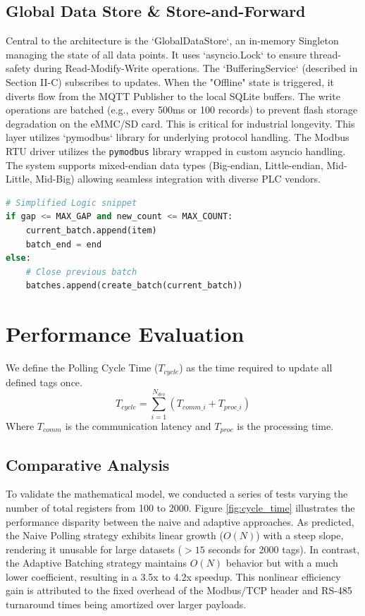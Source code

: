 \documentclass[journal]{IEEEtran}
\begin{document}
\subsection{Global Data Store \& Store-and-Forward}
Central to the architecture is the `GlobalDataStore`, an in-memory Singleton managing the state of all data points. It uses `asyncio.Lock` to ensure thread-safety during Read-Modify-Write operations.
The `BufferingService` (described in Section II-C) subscribes to updates. When the "Offline" state is triggered, it diverts flow from the MQTT Publisher to the local SQLite buffers. The write operations are batched (e.g., every 500ms or 100 records) to prevent flash storage degradation on the eMMC/SD card. This is critical for industrial longevity. This layer utilizes `pymodbus` library for underlying protocol handling.
The Modbus RTU driver utilizes the \texttt{pymodbus} library wrapped in custom asyncio handling. The system supports mixed-endian data types (Big-endian, Little-endian, Mid-Little, Mid-Big) allowing seamless integration with diverse PLC vendors.

\begin{footnotesize}
\begin{lstlisting}[language=Python, caption=Detailed Batching Logic]
# Simplified Logic snippet
if gap <= MAX_GAP and new_count <= MAX_COUNT:
    current_batch.append(item)
    batch_end = end
else:
    # Close previous batch
    batches.append(create_batch(current_batch))
\end{lstlisting}
\end{footnotesize}

\section{Performance Evaluation}
We define the Polling Cycle Time ($T_{cycle}$) as the time required to update all defined tags once.
\begin{equation}
T_{cycle} = \sum_{i=1}^{N_{dev}} (T_{comm\_i} + T_{proc\_i})
\end{equation}
Where $T_{comm}$ is the communication latency and $T_{proc}$ is the processing time.

\subsection{Comparative Analysis}
To validate the mathematical model, we conducted a series of tests varying the number of total registers from 100 to 2000.  Figure \ref{fig:cycle_time} illustrates the performance disparity between the naive and adaptive approaches.
As predicted, the Naive Polling strategy exhibits linear growth ($O(N)$) with a steep slope, rendering it unusable for large datasets ($>15$ seconds for 2000 tags). In contrast, the Adaptive Batching strategy maintains $O(N)$ behavior but with a much lower coefficient, resulting in a 3.5x to 4.2x speedup. This nonlinear efficiency gain is attributed to the fixed overhead of the Modbus/TCP header and RS-485 turnaround times being amortized over larger payloads.
\end{document}

